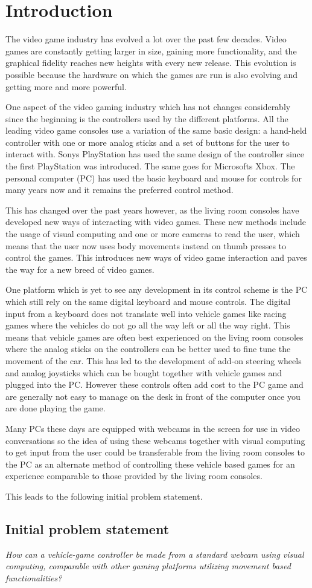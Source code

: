 \section{Introduction}
The video game industry has evolved a lot over the past few decades. Video games are constantly getting larger in size, gaining more functionality, and the graphical fidelity reaches new heights with every new release. This evolution is possible because the hardware on which the games are run is also evolving and getting more and more powerful.
\bigskip

One aspect of the video gaming industry which has not changes considerably since the beginning is the controllers used by the different platforms. All the leading video game consoles use a variation of the same basic design: a hand-held controller with one or more analog sticks and a set of buttons for the user to interact with. Sonys PlayStation has used the same design of the controller since the first PlayStation was introduced. The same goes for Microsofts Xbox. The personal computer (PC) has used the basic keyboard and mouse for controls for many years now and it remains the preferred control method.
\bigskip

This has changed over the past years however, as the living room consoles have developed new ways of interacting with video games. These new methods include the usage of visual computing and one or more cameras to read the user, which means that the user now uses body movements instead on thumb presses to control the games. This introduces new ways of video game interaction and paves the way for a new breed of video games.
\bigskip

One platform which is yet to see any development in its control scheme is the PC which still rely on the same digital keyboard and mouse controls. The digital input from a keyboard does not translate well into vehicle games like racing games where the vehicles do not go all the way left or all the way right. This means that vehicle games are often best experienced on the living room consoles where the analog sticks on the controllers can be better used to fine tune the movement of the car. This has led to the development of add-on steering wheels and analog joysticks which can be bought together with vehicle games and plugged into the PC. However these controls often add cost to the PC game and are generally not easy to manage on the desk in front of the computer once you are done playing the game.
\bigskip

Many PCs these days are equipped with webcams in the screen for use in video conversations so the idea of using these webcams together with visual computing to get input from the user could be transferable from the living room consoles to the PC as an alternate method of controlling these vehicle based games for an experience comparable to those provided by the living room consoles.

\noindent This leads to the following initial problem statement.

\subsection{Initial problem statement}
\emph{How can a vehicle-game controller be made from a standard webcam using visual computing, comparable with other gaming platforms utilizing movement based functionalities?}